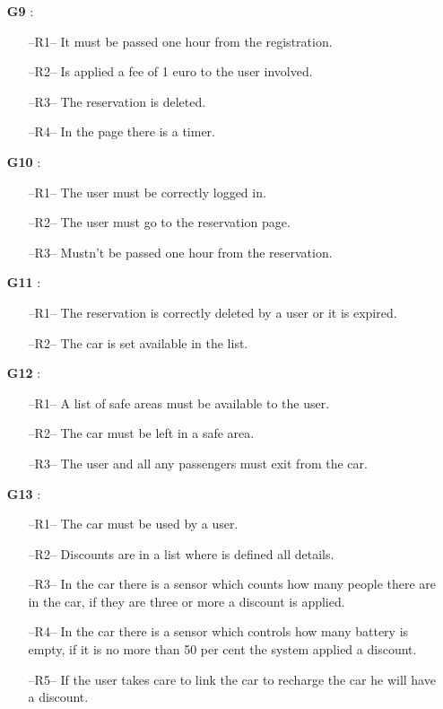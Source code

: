 \begin{itemize}
\clearpage

\item[\textbf{G9}]:
\begin{itemize}
\item[--R1--] It must be passed one hour from the registration.
\item[--R2--] Is applied a fee of 1 euro to the user involved.
\item[--R3--] The reservation is deleted.
\item[--R4--] In the page there is a timer.
\end{itemize}

\item[\textbf{G10}]:
\begin{itemize}
\item[--R1--] The user must be correctly logged in.
\item[--R2--] The user must go to the reservation page.
\item[--R3--] Mustn't be passed one hour from the reservation.
\end{itemize}

\item[\textbf{G11}]:
\begin{itemize}
\item[--R1--] The reservation is correctly deleted by a user or it is expired. 
\item[--R2--] The car is set available in the list.

\end{itemize}

\item[\textbf{G12}]:
\begin{itemize}
\item[--R1--] A list of safe areas must be available to the user.
\item[--R2--] The car must be left in a safe area.
\item[--R3--] The user and all any passengers must exit from the car.
\end{itemize}

\item[\textbf{G13}]:
\begin{itemize}
\item[--R1--] The car must be used by a user.
\item[--R2--] Discounts are in a list where is defined all details.
\item[--R3--] In the car there is a sensor which counts how many people there are in the car, if they are three or more a discount is applied.
\item[--R4--] In the car there is a sensor which controls how many battery is empty, if it is no more than 50 per cent the system applied a discount.
\item[--R5--] If the user takes care to link the car to recharge the car he will have a discount.
\end{itemize}


\end{itemize}
